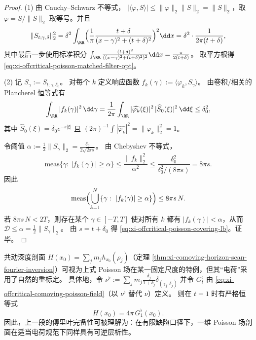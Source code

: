 \begin{proof}
(1) 由 Cauchy--Schwarz 不等式，
\(
|\langle \varphi,S\rangle|\le \|\varphi\|_2\|S\|_2=\|S\|_2
\)，取 \(\varphi=S/\|S\|_2\) 取等号。并且
\[
\|S_{t;\gamma,\delta}\|_2^2
=\delta^2\int_{\RR}\Bigl(\frac{1}{\pi}\frac{t+\delta}{(x-\gamma)^2+(t+\delta)^2}\Bigr)^2\dd x
=\delta^2\cdot\frac{1}{2\pi(t+\delta)},
\]
其中最后一步使用标准积分 \(\int_{\RR}\frac{(t+\delta)^2}{((x-\gamma)^2+(t+\delta)^2)^2}\dd x=\frac{\pi}{2(t+\delta)}\)。
取平方根得 \eqref{eq:xi-offcritical-poisson-matched-filter-opt}。
\par
(2) 记 \(S_\gamma:=S_{t;\gamma,\delta_0}\)。
对每个 \(k\) 定义响应函数 \(f_k(\gamma):=\langle \varphi_k,S_\gamma\rangle\)。
由卷积/相关的 Plancherel 恒等式有
\[
\int_{\RR}|f_k(\gamma)|^2\,\dd\gamma
=\frac{1}{2\pi}\int_{\RR}|\widehat{\varphi_k}(\xi)|^2\,|\widehat S_0(\xi)|^2\,\dd\xi
\le \delta_0^2,
\]
其中 \(\widehat S_0(\xi)=\delta_0 e^{-s|\xi|}\) 且 \((2\pi)^{-1}\int|\widehat{\varphi_k}|^2=\|\varphi_k\|_2^2=1\)。
\par
令阈值 \(\alpha:=\frac12\|S_\gamma\|_2=\frac{\delta_0}{2\sqrt{2\pi s}}\)。
由 Chebyshev 不等式，
\[
\mathrm{meas}\{\gamma:\ |f_k(\gamma)|\ge \alpha\}
\le \frac{\|f_k\|_2^2}{\alpha^2}
\le \frac{\delta_0^2}{\delta_0^2/(8\pi s)}
=8\pi s.
\]
因此
\[
\mathrm{meas}\Bigl(\bigcup_{k=1}^{N}\{\gamma:\ |f_k(\gamma)|\ge \alpha\}\Bigr)
\le 8\pi s\,N.
\]
若 \(8\pi s\,N<2T\)，则存在某个 \(\gamma\in[-T,T]\) 使对所有 \(k\) 都有 \(|f_k(\gamma)|<\alpha\)，从而 \(\mathcal D\le \alpha=\frac12\|S_\gamma\|_2\)。
由 \(s=t+\delta_0\) 得 \eqref{eq:xi-offcritical-poisson-covering-lb}。证毕。
\end{proof}

\begin{remark}\label{rem:xi-poisson-field-vs-depth-profile}
共动深度剖面 \(H(x_0)=\sum_j m_j h_{x_0}(\rho_j)\)（定理 \ref{thm:xi-comoving-horizon-scan-fourier-inversion}）可视为上式 Poisson 场在某一固定尺度的特例，但其“电荷”采用了自然的重标定。
具体地，令
\(
\nu^{\flat}:=\sum_j m_j\frac{\delta_j}{1+\delta_j}\delta_{(\gamma_j,\delta_j)}
\)
并令 \(G^{\flat}_t\) 由 \eqref{eq:xi-offcritical-comoving-poisson-field}（以 \(\nu^{\flat}\) 替代 \(\nu\)）定义。
则在 \(t=1\) 时有严格恒等式
\[
H(x_0)=4\pi\,G^{\flat}_1(x_0).
\]
因此，上一段的傅里叶完备性可被理解为：在有限缺陷口径下，一维 Poisson 场剖面在适当电荷规范下同样具有可逆层析性。
\end{remark}


